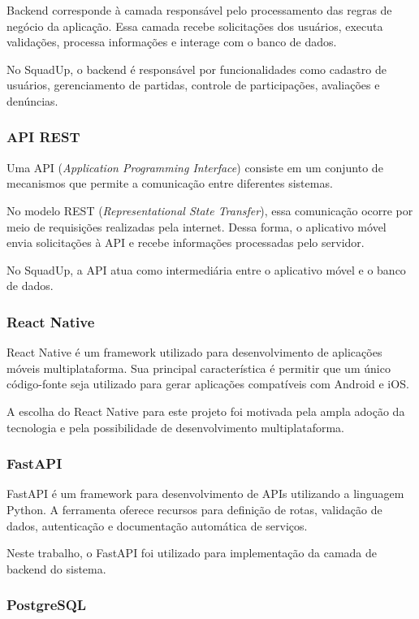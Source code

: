 \documentclass[a4paper, 12pt]{article}
\begin{document}
\begin{justify}
Backend corresponde à camada responsável pelo processamento das regras de negócio da aplicação. Essa camada recebe solicitações dos usuários, executa validações, processa informações e interage com o banco de dados.

No SquadUp, o backend é responsável por funcionalidades como cadastro de usuários, gerenciamento de partidas, controle de participações, avaliações e denúncias.

\subsubsection{API REST}

Uma API (\textit{Application Programming Interface}) consiste em um conjunto de mecanismos que permite a comunicação entre diferentes sistemas.

No modelo REST (\textit{Representational State Transfer}), essa comunicação ocorre por meio de requisições realizadas pela internet. Dessa forma, o aplicativo móvel envia solicitações à API e recebe informações processadas pelo servidor.

No SquadUp, a API atua como intermediária entre o aplicativo móvel e o banco de dados.

\subsubsection{React Native}

React Native é um framework utilizado para desenvolvimento de aplicações móveis multiplataforma. Sua principal característica é permitir que um único código-fonte seja utilizado para gerar aplicações compatíveis com Android e iOS.

A escolha do React Native para este projeto foi motivada pela ampla adoção da tecnologia e pela possibilidade de desenvolvimento multiplataforma.

\subsubsection{FastAPI}

FastAPI é um framework para desenvolvimento de APIs utilizando a linguagem Python. A ferramenta oferece recursos para definição de rotas, validação de dados, autenticação e documentação automática de serviços.

Neste trabalho, o FastAPI foi utilizado para implementação da camada de backend do sistema.

\subsubsection{PostgreSQL}


\end{justify}
\end{document}
